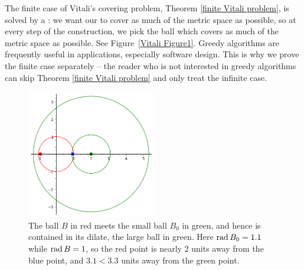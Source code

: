 \begin{subsec}
The finite case of Vitali's covering problem, Theorem \ref{finite Vitali problem}, is solved by a : we want our to cover as much of the metric space as possible, so at every step of the construction, we pick the ball which covers as much of the metric space as possible. See Figure~\ref{Vitali Figure1}.
Greedy algorithms are frequently useful in applications, especially software design.
This is why we prove the finite case separately -- the reader who is not interested in greedy algorithms can skip Theorem \ref{finite Vitali problem} and only treat the infinite case.
\end{subsec}

\begin{figure}
\label{Vitali Figure2}
\caption{The ball $B$ in red meets the small ball $B_{0}$ in green, and hence is contained in its dilate, the large ball in green.
Here $\operatorname{rad} B_{0} = 1.1$ while $\operatorname{rad} B = 1$, so the red point is nearly $2$ units away from the blue point, and $3.1 < 3.3$ units away from the green point.}
\centering \includegraphics[width=0.5\textwidth]{graphics/Vitali2}
\end{figure}

